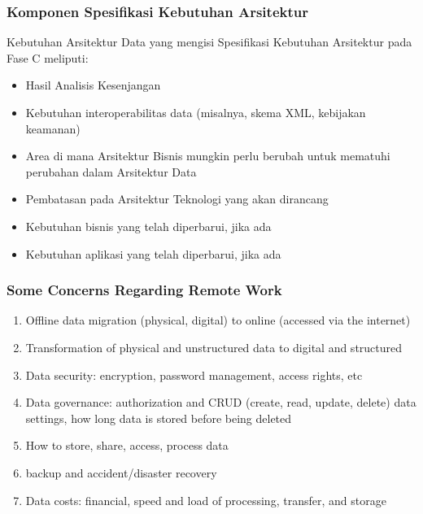\documentclass[aspectratio=169, table]{beamer}
\begin{document}
\begin{frame}
	\frametitle{Komponen Spesifikasi Kebutuhan Arsitektur}
	\label{sec:data_komponen_spesifikasi_kebutuhan}
	Kebutuhan Arsitektur Data yang mengisi Spesifikasi Kebutuhan Arsitektur pada Fase C meliputi:
	\begin{itemize}
		\item Hasil Analisis Kesenjangan
		\item Kebutuhan interoperabilitas data (misalnya, skema XML, kebijakan keamanan)
		\item Area di mana Arsitektur Bisnis mungkin perlu berubah untuk mematuhi perubahan dalam Arsitektur Data
		\item Pembatasan pada Arsitektur Teknologi yang akan dirancang
		\item Kebutuhan bisnis yang telah diperbarui, jika ada
		\item Kebutuhan aplikasi yang telah diperbarui, jika ada
	\end{itemize}
\end{frame}

    \begin{frame}
        \frametitle{Some Concerns Regarding Remote Work}
        \begin{enumerate}
            \item Offline data migration (physical, digital) to online (accessed via the internet)
            \item Transformation of physical and unstructured data to digital and structured
            \item Data security: encryption, password management, access rights, etc
            \item Data governance: authorization and CRUD (create, read, update, delete) data settings, how long data is stored before being deleted
            \item How to store, share, access, process data
            \item backup and accident/disaster recovery
            \item Data costs: financial, speed and load of processing, transfer, and storage
        \end{enumerate}
    \end{frame}
\end{document}
